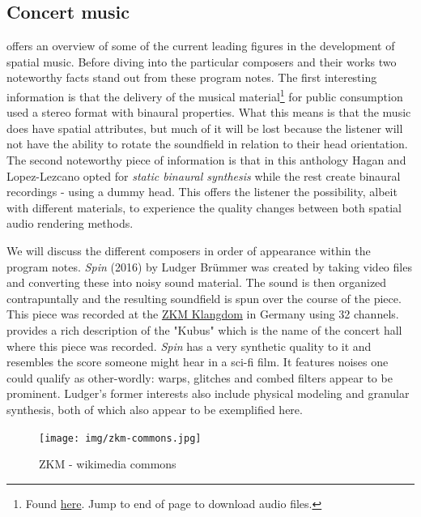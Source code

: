 \subsection{Concert music}

\cite{hagan2017sound} offers an overview of some of the current leading figures in the development of spatial music. Before diving into the particular composers and their works two noteworthy facts stand out from these program notes. The first interesting information is that the delivery of the musical material\footnote{Found \href{https://muse.jhu.edu/article/656037}{here}. Jump to end of page to download audio files.} for public consumption used a stereo format with binaural properties. What this means is that the music does have spatial attributes, but much of it will be lost because the listener will not have the ability to rotate the soundfield in relation to their head orientation. The second noteworthy piece of information is that in this anthology Hagan and Lopez-Lezcano opted for \textit{static binaural synthesis} while the rest create binaural recordings - using a dummy head. This offers the listener the possibility, albeit with different materials, to experience the quality changes between both spatial audio rendering methods.

We will discuss the different composers in order of appearance within the program notes. \textit{Spin} (2016) by Ludger Brümmer was created by taking video files and converting these into noisy sound material. The sound is then organized contrapuntally and the resulting soundfield is spun over the course of the piece. This piece was recorded at the \href{https://zkm.de/en}{ZKM Klangdom} in Germany using 32 channels. \cite{ramakrishnan2006zkm} provides a rich description of the "Kubus" which is the name of the concert hall where this piece was recorded. \textit{Spin} has a very synthetic quality to it and resembles the score someone might hear in a sci-fi film. It features noises one could qualify as other-wordly: warps, glitches and combed filters appear to be prominent. Ludger's former interests also include physical modeling and granular synthesis, both of which also appear to be exemplified here. 

\begin{figure}[ht!]%
\centering
\texttt{[image: img/zkm-commons.jpg]} 
\caption{ZKM - wikimedia commons}
\end{figure}


